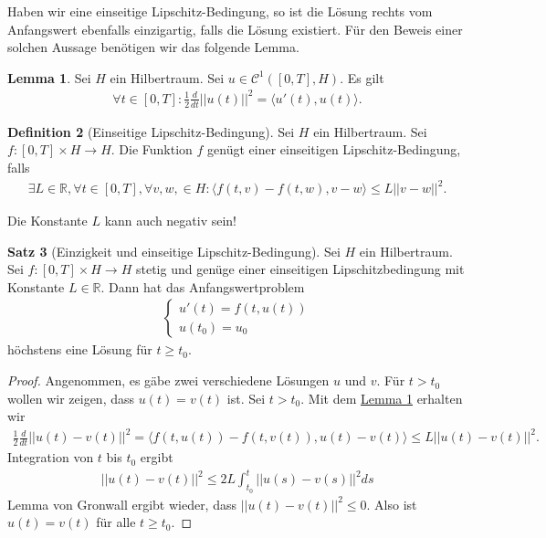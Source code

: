 \documentclass[a4paper]{article}
\theoremstyle{definition}
\newtheorem{theorem}{Satz}
\newtheorem{lemma}[theorem]{Lemma}
\newtheorem{definition}[theorem]{Definition}
\begin{document}
Haben wir eine einseitige Lipschitz-Bedingung, so ist die Lösung rechts vom Anfangswert ebenfalls einzigartig, falls die Lösung existiert. Für den Beweis einer solchen Aussage benötigen wir das folgende Lemma.

\begin{lemma}\label{lemma:einseitige-lipschitz-bedingung}
    Sei $H$ ein Hilbertraum. Sei $u \in \mathcal{C}^1([0,T], H)$. Es gilt 
    \begin{align*}
        \forall t \in [0,T]: \frac{1}{2}\frac{d}{dt}||u(t)||^2 = \langle u'(t), u(t) \rangle.
    \end{align*}
\end{lemma}

\begin{definition}[Einseitige Lipschitz-Bedingung]
    Sei $H$ ein Hilbertraum. Sei $f: [0,T] \times H \to H$. Die Funktion $f$ genügt einer einseitigen Lipschitz-Bedingung, falls 
    \begin{align*}
        \exists L \in \mathbb{R}, \forall t \in [0,T], \forall v,w, \in H: \langle f(t, v) - f(t,w), v-w\rangle \leq L ||v-w||^2.
    \end{align*}
\end{definition}

Die Konstante $L$ kann auch negativ sein!

\begin{theorem}[Einzigkeit und einseitige Lipschitz-Bedingung]
    Sei $H$ ein Hilbertraum. Sei $f: [0,T] \times H \to H$ stetig und genüge einer einseitigen Lipschitzbedingung mit Konstante $L \in \mathbb{R}$. Dann hat das Anfangswertproblem
    \begin{align*}
        \begin{cases}
            u'(t) = f(t,u(t)) \\
            u(t_0) = u_0
        \end{cases}
    \end{align*}
    höchstens eine Lösung für $t \geq t_0$.
\end{theorem}

\begin{proof}
    Angenommen, es gäbe zwei verschiedene Lösungen $u$ und $v$. Für $t > t_0$ wollen wir zeigen, dass $u(t) = v(t)$ ist. Sei $t > t_0$. Mit dem \hyperref[lemma:einseitige-lipschitz-bedingung]{Lemma \ref{lemma:einseitige-lipschitz-bedingung}} erhalten wir 
    \begin{align*}
        \frac{1}{2}\frac{d}{dt}||u(t) - v(t)||^2 = \langle f(t,u(t)) - f(t,v(t)), u(t) - v(t) \rangle \leq L ||u(t) - v(t)||^2.
    \end{align*}
    Integration von $t$ bis $t_0$ ergibt 
    \begin{align*}
        ||u(t) - v(t)||^2 \leq 2L \int^t_{t_0}||u(s) - v(s)||^2 ds
    \end{align*}
    Lemma von Gronwall ergibt wieder, dass $||u(t) - v(t)||^2 \leq 0$. Also ist $u(t) = v(t)$ für alle $t \geq t_0$.
\end{proof}
\end{document}
